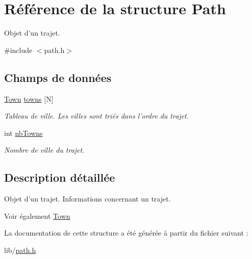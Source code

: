 \hypertarget{structPath}{
\section{Référence de la structure Path}
\label{structPath}
}


Objet d'un trajet.  




{\ttfamily \#include $<$path.h$>$}

\subsection*{Champs de données}
\begin{DoxyCompactItemize}
\item 
\hypertarget{structPath_aa6e2db030cf042e7ae3fe053fa6f0195}{
\hyperlink{structTown}{Town} \hyperlink{structPath_aa6e2db030cf042e7ae3fe053fa6f0195}{towns} \mbox{[}N\mbox{]}}
\label{structPath_aa6e2db030cf042e7ae3fe053fa6f0195}

\begin{DoxyCompactList}\small\item\em Tableau de ville. Les villes sont triés dans l'ordre du trajet. \item\end{DoxyCompactList}\item 
\hypertarget{structPath_a3caeb081a51e3fb89e638aa4bccd2110}{
int \hyperlink{structPath_a3caeb081a51e3fb89e638aa4bccd2110}{nbTowns}}
\label{structPath_a3caeb081a51e3fb89e638aa4bccd2110}

\begin{DoxyCompactList}\small\item\em Nombre de ville du trajet. \item\end{DoxyCompactList}\end{DoxyCompactItemize}


\subsection{Description détaillée}
Objet d'un trajet. Informations concernant un trajet.

\begin{DoxySeeAlso}{Voir également}
\hyperlink{structTown}{Town} 
\end{DoxySeeAlso}


La documentation de cette structure a été générée à partir du fichier suivant :\begin{DoxyCompactItemize}
\item 
lib/\hyperlink{path_8h}{path.h}\end{DoxyCompactItemize}
